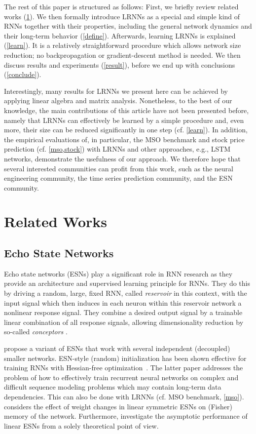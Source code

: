 \documentclass[preprint,12pt,times,authoryear]{elsarticle}%
\theoremstyle{definition}
\begin{document}
The rest of this paper is structured as follows: First, we briefly review related
works (\cref{related}). We then formally introduce LRNNs as a special and simple
kind of RNNs together with their properties, including the general network
dynamics and their long-term behavior (\cref{define}). Afterwards, learning
LRNNs is explained (\cref{learn}). It is a relatively straightforward procedure
which allows network size reduction; no backpropagation or gradient-descent
method is needed. We then discuss results and experiments (\cref{result}),
before we end up with conclusions (\cref{conclude}).

Interestingly, many results for LRNNs we present here can be achieved by
applying linear algebra and matrix analysis. Nonetheless, to the best of our
knowledge, the main contributions of this article have not been presented
before, namely that LRNNs can effectively be learned by a simple procedure and,
even more, their size can be reduced significantly in one step (cf.
\cref{learn}). In addition, the empirical evaluations of, in particular, the MSO
benchmark and stock price prediction (cf. \cref{mso,stock}) with LRNNs and other
approaches, e.g., LSTM networks, demonstrate the usefulness of our approach. We
therefore hope that several interested communities can profit from this work,
such as the neural engineering community, the time series prediction community,
and the ESN community.

\section{Related Works}\label{related}

\subsection{Echo State Networks}

Echo state networks (ESNs) \citep{JH04,Jae07} play a significant role in RNN
research as they provide an architecture and supervised learning principle for
RNNs. They do this by driving a random, large, fixed RNN, called \emph{reservoir}
in this context, with the input signal which then induces in each neuron within
this reservoir network a nonlinear response signal. They combine a desired
output signal by a trainable linear combination of all response signals,
allowing dimensionality reduction by so-called \emph{conceptors} \citep{Jae14,Jae17}.

\citet{XYH07} propose a variant of ESNs that work with several independent
(decoupled) smaller networks. ESN-style (random) initialization has been shown
effective for training RNNs with Hessian-free optimization~\citep{MS11}. The
latter paper addresses the problem of how to effectively train recurrent neural
networks on complex and difficult sequence modeling problems which may contain
long-term data dependencies. This can also be done with LRNNs (cf. MSO
benchmark, \cref{mso}).
\citet{Tin18} considers the effect of weight changes in linear symmetric ESNs on
(Fisher) memory of the network. Furthermore, \citet{CW+16} investigate the
asymptotic performance of linear ESNs from a solely theoretical point of view.
\end{document}
